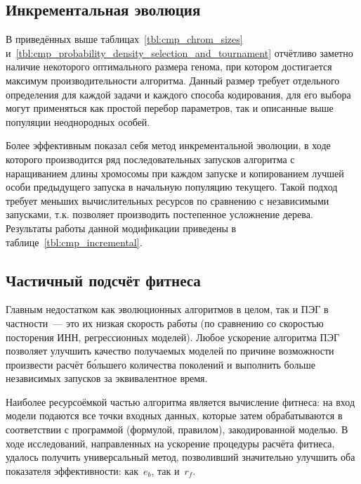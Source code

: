 


\subsection{Инкрементальная эволюция}

В приведённых выше таблицах~\ref{tbl:cmp_chrom_sizes} и~\ref{tbl:cmp_probability_density_selection_and_tournament} отчётливо заметно наличие некоторого оптимального размера генома, при котором достигается максимум производительности алгоритма. Данный размер требует отдельного определения для каждой задачи и каждого способа кодирования, для его выбора могут применяться как простой перебор параметров, так и описанные выше популяции неоднородных особей.

Более эффективным показал себя метод инкрементальной эволюции, в ходе которого производится ряд последовательных запусков алгоритма с наращиванием длины хромосомы при каждом запуске и копированием лучшей особи предыдущего запуска в начальную популяцию текущего. Такой подход требует меньших вычислительных ресурсов по сравнению с независимыми запусками, т.к. позволяет производить постепенное усложнение дерева. Результаты работы данной модификации приведены в таблице~\ref{tbl:cmp_incremental}.




\subsection{Частичный подсчёт фитнеса}
\cite{ferreira:2001:wsc6Aa}
Главным недостатком как эволюционных алгоритмов в целом, так и ПЭГ в частности~--- это их низкая скорость работы (по сравнению со скоростью посторения ИНН, регрессионных моделей). Любое ускорение алгоритма ПЭГ позволяет улучшить качество получаемых моделей по причине возможности произвести расчёт б\'{о}льшего количества поколений и выполнить больше независимых запусков за эквивалентное время.

Наиболее ресурсоёмкой частью алгоритма является вычисление фитнеса: на вход модели подаются все точки входных данных, которые затем обрабатываются в соответствии с программой (формулой, правилом), закодированной моделью. В ходе исследований, направленных на ускорение процедуры расчёта фитнеса, удалось получить универсальный метод, позволивший значительно улучшить оба показателя эффективности: как~$e_{b}$, так и~$r_{f}$.

